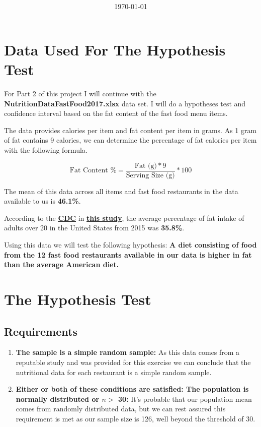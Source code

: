 \documentclass[12pt,fleqn]{article}
\title{\classdescription\ \\ \classname\ \\ $\ $ \\ \assignment}
\author{\authorname}
\date{\today}
\let\oldhref\href
\renewcommand{\href}[2]{\oldhref{#1}{\bfseries#2}}
\begin{document}
\maketitle

\section{Data Used For The Hypothesis Test}
For Part 2 of this project I will continue with the \textbf{NutritionDataFastFood2017.xlsx} data set. I will do a hypotheses test and confidence interval based on the fat content of the fast food menu items.

The data provides calories per item and fat content per item in grams. As 1 gram of fat contains 9 calories, we can determine the percentage of fat calories per item with the following formula.

\begin{equation}
  \text{Fat Content \%} = \frac{\text{Fat (g)} * 9}{\text{Serving Size (g)}} * 100
\end{equation}

The mean of this data across all items and fast food restaurants in the data available to us is \textbf{46.1\%}.

According to the \href{https://www.cdc.gov/nchs/fastats/diet.htm}{\underline{CDC}} in \href{https://www.cdc.gov/nchs/data/hus/2020-2021/McrNutr.pdf}{\underline{this study}}, the average percentage of fat intake of adults over 20 in the United States from 2015 was \textbf{35.8\%}.

Using this data we will test the following hypothesis: \textbf{A diet consisting of food from the 12 fast food restaurants available in our data is higher in fat than the average American diet.}


\section{The Hypothesis Test}

\subsection{Requirements}
\begin{enumerate}
\item \textbf{The sample is a simple random sample:} As this data comes from a reputable study and was provided for this exercise we can conclude that the nutritional data for each restaurant is a simple random sample.
  \item \textbf{Either or both of these conditions are satisfied: The population is normally distributed or $n >$ 30:} It's probable that our population mean comes from randomly distributed data, but we can rest assured this requirement is met as our sample size is 126, well beyond the threshold of 30.
\end{enumerate}
\end{document}
